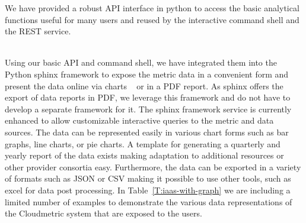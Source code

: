 \documentclass{tex/sig-alternate-2013}
\begin{document}
{\begin{description}[leftmargin=*,itemsep=0pt,topsep=0pt]
\item[Programming API.] We have provided a robust API interface in python to access the basic analytical functions useful for many users and reused by the interactive command shell and the REST service.

\item[Graphical Representation and Printable Reports.] ~\\ Using our basic API and command shell, we have integrated them into the Python sphinx framework \cite{brandl2009sphinx} to expose the metric data in a convenient form and present the data online via charts ~\cite{highsoft2012highcharts} or in a PDF report. As sphinx offers the export of data reports in PDF, we leverage this framework and do not have to develop a separate framework for it. The sphinx framework service is currently enhanced to allow customizable interactive queries to the metric and data sources. The data can be represented easily in various chart forms such as bar graphs, line charts, or pie charts. A template for generating a quarterly and yearly report of the data exists making adaptation to additional resources or other provider consortia easy. Furthermore, the data can be exported in a variety of formats such as JSON or CSV making it possible to use other tools, such as excel for data post processing.  In Table~\ref{T:iaas-with-graph} we are including a limited number of examples to demonstrate the various data representations of the Cloudmetric system that are exposed to the users.

\end{description}

}
\end{document}
